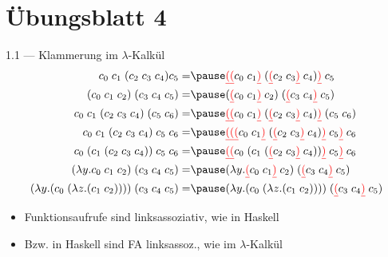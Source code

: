 \documentclass{beamer}
\begin{document}
\section{Übungsblatt 4}

\newcommand{\E}{\;}

\newcommand{\liin}[2]{#1\E{}#2}
\newcommand{\liiin}[3]{#1\E{}#2\E{}#3}
\newcommand{\livn}[4]{#1\E{}#2\E{}#3\E{}#4}
\newcommand{\lvn}[5]{#1\E{}#2\E{}#3\E{}#4\E{}#5}

\newcommand{\lii}[2]{(#1\E{}#2)}
\newcommand{\liii}[3]{(#1\E{}#2\E{}#3)}

\newcommand{\liir}[2]{\textcolor{red}{\underline{(}}#1\E{}#2\textcolor{red}{\underline{)}}}
\newcommand{\liiir}[3]{\textcolor{red}{\underline{(}}#1\E{}#2\E{}#3\textcolor{red}{\underline{)}}}

\newcommand{\abs}[2]{\lambda{}#1.#2}

\begin{frame}{1.1 --- Klammerung im $\lambda$-Kalkül}
	\footnotesize
	\begin{eqnarray}
		\liiin{c_0}{c_1}{\liii{c_2}{c_3}{c_4}}{c_5}                   =& \pause \liin{\liir{\liir{c_0}{c_1}}{\lii{\liir{c_2}{c_3}}{c_4}}}{c_5}             \\
		\liin{\liii{c_0}{c_1}{c_2}}{\liii{c_3}{c_4}{c_5}}             =& \pause \liin{\lii{\liir{c_0}{c_1}}{c_2}}{\lii{\liir{c_3}{c_4}}{c_5}}              \\
		\livn{c_0}{c_1}{\liii{c_2}{c_3}{c_4}}{\lii{c_5}{c_6}}         =& \pause \liin{\liir{\liir{c_0}{c_1}}{\lii{\liir{c_2}{c_3}}{c_4}}}{\lii{c_5}{c_6}}  \\
		\lvn{c_0}{c_1}{\liii{c_2}{c_3}{c_4}}{c_5}{c_6}                =& \pause \liin{\liir{\liir{\liir{c_0}{c_1}}{\lii{\liir{c_2}{c_3}}{c_4}}}{c_5}}{c_6} \\
		\livn{c_0}{\lii{c_1}{\liii{c_2}{c_3}{c_4}}}{c_5}{c_6}         =& \pause \liin{\liir{\liir{c_0}{\lii{c_1}{\lii{\liir{c_2}{c_3}}{c_4}}}}{c_5}}{c_6}  \\
		\liin{(\abs{y}{\liiin{c_0}{c_1}{c_2}})}{\liii{c_3}{c_4}{c_5}} =& \pause \liin{(\abs{y}{\liin{\liir{c_0}{c_1}}{c_2}})}{\lii{\liir{c_3}{c_4}}{c_5}}  \\
                \liin{(\abs{y}{\lii{c_0}{(\abs{z}{\lii{c_1}{c_2}})}})}{\liii{c_3}{c_4}{c_5}} =& \pause \liin{(\abs{y}{\lii{c_0}{(\abs{z}{\lii{c_1}{c_2}})}})}{\lii{\liir{c_3}{c_4}}{c_5}}
	\end{eqnarray}

	\normalsize
	\begin{itemize}
		\item Funktionsaufrufe sind linksassoziativ, wie in Haskell
		\item Bzw. in Haskell sind FA linksassoz., wie im $\lambda$-Kalkül
	\end{itemize}
\end{frame}
\end{document}
